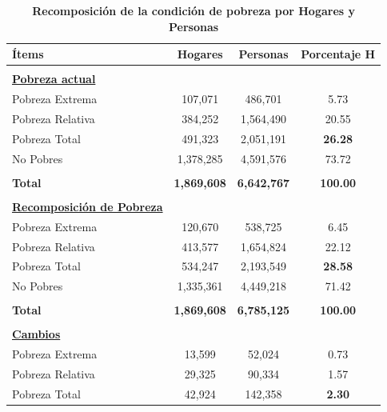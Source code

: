 \begin{table}[H]
	\centering
	\caption{\textbf{Recomposición de la condición de pobreza por Hogares y Personas }}
	\label{Tabla 6}
	\resizebox{10.5cm}{!} { 
		\begin{tabular}{lccc} \toprule			
		\textbf{Ítems}	&	\textbf{Hogares}	&	\textbf{Personas}	&	\textbf{Porcentaje H}	\\ \midrule 
		&		&		&		\\  
		\underline{\textbf{Pobreza actual}}	&		&		&		\\ 
		Pobreza Extrema	&	107,071	&	486,701	&	5.73	\\ 
		Pobreza Relativa	&	384,252	&	1,564,490	&	20.55	\\ 
		Pobreza Total	&	491,323	&	2,051,191	&	\textbf{26.28}	\\ 
		No Pobres	&	1,378,285	&	4,591,576	&	73.72	\\ 
		&		&		&		\\ 
		\textbf{Total}	&	\textbf{1,869,608}	&	\textbf{6,642,767}	&	\textbf{100.00}	\\ 
		&		&		&		\\ 
		\underline{\textbf{Recomposición de Pobreza}}	&		&		&		\\ 
		Pobreza Extrema	&	120,670	&	538,725	&	6.45	\\ 
		Pobreza Relativa	&	413,577	&	1,654,824	&	22.12	\\ 
		Pobreza Total	&	534,247	&	2,193,549	&	\textbf{28.58}	\\ 
		No Pobres	&	1,335,361	&	4,449,218	&	71.42	\\ 
		&		&		&		\\ 
		\textbf{Total}	&	\textbf{1,869,608}	&	\textbf{6,785,125}	&	\textbf{100.00}	\\ 
		&		&		&		\\ 
		\underline{\textbf{Cambios}} 	&		&		&		\\ 
		Pobreza Extrema	&	13,599	&	52,024	&	0.73	\\ 
		Pobreza Relativa	&	29,325	&	90,334	&	1.57	\\ 
		Pobreza Total	&	42,924	&	142,358	&	\textbf{2.30}	\\  \bottomrule
		
				
		\end{tabular} 
		
	}
	{\small {}}
	
\end{table}

